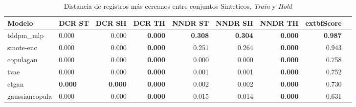 \begin{table}[H]
\centering
\caption{Distancia de registros más cercanos entre conjuntos Sinteticos, \emph{Train} y \emph{Hold}}
\label{table-dcr-economicos-b-3}
\begin{tabular}{|l|l|r|r|r|r|r|r|r|}
\hline
\rowcolor[gray]{0.8}
Modelo & DCR ST & DCR SH & DCR TH & NNDR ST & NNDR SH & NNDR TH & 	extbf{Score} \\
\hline tddpm\_mlp & 0.000 & 0.000 & \cellcolor[rgb]{0.9, 0.54, 0.52} \bfseries 0.000 & \bfseries 0.308 & \bfseries 0.304 & \cellcolor[rgb]{0.9, 0.54, 0.52} \bfseries 0.000 & \bfseries 0.987 \\
\hline smote-enc & 0.000 & 0.000 & \cellcolor[rgb]{0.9, 0.54, 0.52} \bfseries 0.000 & 0.251 & 0.264 & \cellcolor[rgb]{0.9, 0.54, 0.52} \bfseries 0.000 & 0.943 \\
\hline copulagan & \cellcolor[rgb]{0.9, 0.54, 0.52} 0.000 & \cellcolor[rgb]{0.9, 0.54, 0.52} 0.000 & \cellcolor[rgb]{0.9, 0.54, 0.52} \bfseries 0.000 & \cellcolor[rgb]{0.9, 0.54, 0.52} 0.000 & \cellcolor[rgb]{0.9, 0.54, 0.52} 0.000 & \cellcolor[rgb]{0.9, 0.54, 0.52} \bfseries 0.000 & 0.758 \\
\hline tvae & 0.000 & 0.000 & \cellcolor[rgb]{0.9, 0.54, 0.52} \bfseries 0.000 & 0.001 & 0.001 & \cellcolor[rgb]{0.9, 0.54, 0.52} \bfseries 0.000 & 0.752 \\
\hline ctgan & \bfseries 0.000 & \bfseries 0.000 & \cellcolor[rgb]{0.9, 0.54, 0.52} \bfseries 0.000 & 0.002 & 0.002 & \cellcolor[rgb]{0.9, 0.54, 0.52} \bfseries 0.000 & 0.730 \\
\hline gaussiancopula & 0.000 & 0.000 & \cellcolor[rgb]{0.9, 0.54, 0.52} \bfseries 0.000 & 0.015 & 0.014 & \cellcolor[rgb]{0.9, 0.54, 0.52} \bfseries 0.000 & 0.631 \\
\hline
\end{tabular}
\end{table}

